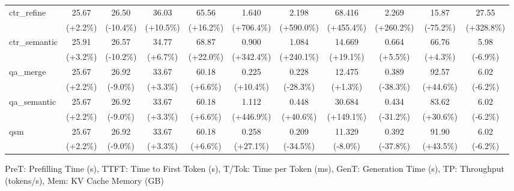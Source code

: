 \begin{table}[t]
{\begin{tabular}{l|cccccccccc}
    ctr\_refine & 25.67 & 26.50 & 36.03 & 65.56 & 1.640 & 2.198 & 68.416 & 2.269 & 15.87 & 27.55 \\
     & {\tiny\color{red!70!black}(+2.2\%)} & {\tiny\color{green!60!black}(-10.4\%)} & {\tiny\color{red!70!black}(+10.5\%)} & {\tiny\color{red!70!black}(+16.2\%)} & {\tiny\color{red!70!black}(+706.4\%)} & {\tiny\color{red!70!black}(+590.0\%)} & {\tiny\color{red!70!black}(+455.4\%)} & {\tiny\color{red!70!black}(+260.2\%)} & {\tiny\color{red!70!black}(-75.2\%)} & {\tiny\color{red!70!black}(+328.8\%)} \\
    ctr\_semantic & 25.91 & 26.57 & 34.77 & 68.87 & 0.900 & 1.084 & 14.669 & 0.664 & 66.76 & 5.98 \\
     & {\tiny\color{red!70!black}(+3.2\%)} & {\tiny\color{green!60!black}(-10.2\%)} & {\tiny\color{red!70!black}(+6.7\%)} & {\tiny\color{red!70!black}(+22.0\%)} & {\tiny\color{red!70!black}(+342.4\%)} & {\tiny\color{red!70!black}(+240.1\%)} & {\tiny\color{red!70!black}(+19.1\%)} & {\tiny\color{red!70!black}(+5.5\%)} & {\tiny\color{green!60!black}(+4.3\%)} & {\tiny\color{green!60!black}(-6.9\%)} \\
    qa\_merge & 25.67 & 26.92 & 33.67 & 60.18 & 0.225 & 0.228 & 12.475 & 0.389 & 92.57 & 6.02 \\
     & {\tiny\color{red!70!black}(+2.2\%)} & {\tiny\color{green!60!black}(-9.0\%)} & {\tiny\color{red!70!black}(+3.3\%)} & {\tiny\color{red!70!black}(+6.6\%)} & {\tiny\color{red!70!black}(+10.4\%)} & {\tiny\color{green!60!black}(-28.3\%)} & {\tiny\color{red!70!black}(+1.3\%)} & {\tiny\color{green!60!black}(-38.3\%)} & {\tiny\color{green!60!black}(+44.6\%)} & {\tiny\color{green!60!black}(-6.2\%)} \\
    qa\_semantic & 25.67 & 26.92 & 33.67 & 60.18 & 1.112 & 0.448 & 30.684 & 0.434 & 83.62 & 6.02 \\
     & {\tiny\color{red!70!black}(+2.2\%)} & {\tiny\color{green!60!black}(-9.0\%)} & {\tiny\color{red!70!black}(+3.3\%)} & {\tiny\color{red!70!black}(+6.6\%)} & {\tiny\color{red!70!black}(+446.9\%)} & {\tiny\color{red!70!black}(+40.6\%)} & {\tiny\color{red!70!black}(+149.1\%)} & {\tiny\color{green!60!black}(-31.2\%)} & {\tiny\color{green!60!black}(+30.6\%)} & {\tiny\color{green!60!black}(-6.2\%)} \\
    qsm & 25.67 & 26.92 & 33.67 & 60.18 & 0.258 & 0.209 & 11.329 & 0.392 & 91.90 & 6.02 \\
     & {\tiny\color{red!70!black}(+2.2\%)} & {\tiny\color{green!60!black}(-9.0\%)} & {\tiny\color{red!70!black}(+3.3\%)} & {\tiny\color{red!70!black}(+6.6\%)} & {\tiny\color{red!70!black}(+27.1\%)} & {\tiny\color{green!60!black}(-34.5\%)} & {\tiny\color{green!60!black}(-8.0\%)} & {\tiny\color{green!60!black}(-37.8\%)} & {\tiny\color{green!60!black}(+43.5\%)} & {\tiny\color{green!60!black}(-6.2\%)} \\
    \bottomrule
    \end{tabular}%
    }
    \vspace{0.1cm}
    \footnotesize{PreT: Prefilling Time (s), TTFT: Time to First Token (s), T/Tok: Time per Token (ms), GenT: Generation Time (s), TP: Throughput (tokens/s), Mem: KV Cache Memory (GB)}
\end{table}


